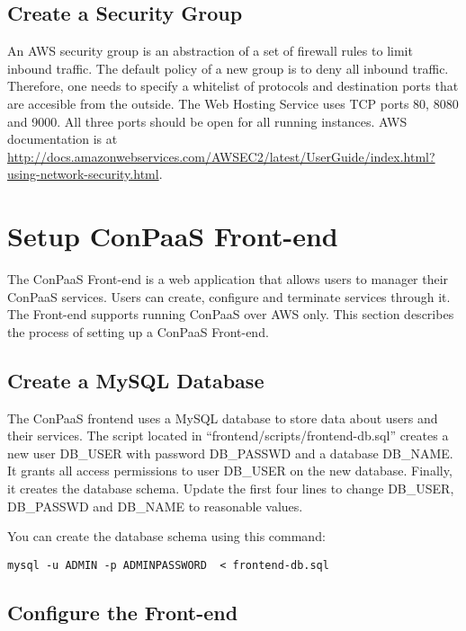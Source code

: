 \documentclass[12pt]{article}
\newenvironment{framedbox}[1]%
{\begin{framed}
 \begingroup
 \fontsize{#1}{#1}\selectfont
}
{
 \endgroup
 \end{framed}
}
\begin{document}
\subsection{Create a Security Group}

An AWS security group is an abstraction of a set of firewall rules to
limit inbound traffic. The default policy of a new group is to deny
all inbound traffic. Therefore, one needs to specify a whitelist of
protocols and destination ports that are accesible from the outside.
The Web Hosting Service uses TCP ports 80, 8080 and 9000. All three
ports should be open for all running instances.  AWS documentation is
at
\href{http://docs.amazonwebservices.com/AWSEC2/latest/UserGuide/index.html?using-network-security.html}{http://docs.amazonwebservices.com/AWSEC2/latest/UserGuide/index.html?using-network-security.html}.


\section{Setup ConPaaS Front-end}

The ConPaaS Front-end is a web application that allows users to
manager their ConPaaS services. Users can create, configure and
terminate services through it. The Front-end supports running ConPaaS
over AWS only. This section describes the process of setting up a
ConPaaS Front-end.

\subsection{Create a MySQL Database}

The ConPaaS frontend uses a MySQL database to store data about users
and their services. The script located in
``frontend/scripts/frontend-db.sql'' creates a new user DB\_USER with
password DB\_PASSWD and a database DB\_NAME. It grants all access
permissions to user DB\_USER on the new database. Finally, it creates
the database schema. Update the first four lines to change DB\_USER,
DB\_PASSWD and DB\_NAME to reasonable values.

You can create the database schema using this command:

\begin{framedbox}{8pt}\begin{verbatim}
mysql -u ADMIN -p ADMINPASSWORD  < frontend-db.sql
\end{verbatim}\end{framedbox}


\subsection{Configure the Front-end}
\end{document}

